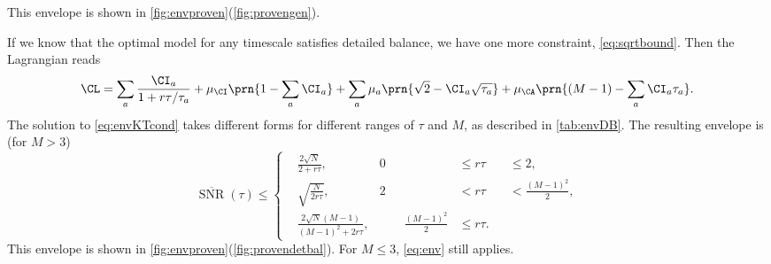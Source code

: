 \documentclass[12pt]{article}
\DeclareMathOperator{\snr}{SNR}
\newcommand{\snrb}{\overline{\snr}}
\begin{document}
This envelope is shown in \cref{fig:envproven}(\ref{fig:provengen}).

If we know that the optimal model for any timescale satisfies detailed balance, we have one more constraint, \cref{eq:sqrtbound}.
Then the Lagrangian reads
%
\begin{equation}\label{eq:envDBlagrangian}
  \CL = \sum_a \frac{\CI_a}{1+r\tau/\tau_a} + \mu_\CI \prn{1 - \sum_a \CI_a} 
      + \sum_a \mu_a \prn{\sqrt{2} - \CI_a \sqrt{\tau_a}} + \mu_\CA \prn{(M-1) - \sum_a \CI_a \tau_a}.
\end{equation}
%
The solution to \cref{eq:envKTcond} takes different forms for different ranges of \(\tau\) and \(M\),
as described in \cref{tab:envDB}.
The resulting envelope is (for \(M > 3\))
%
\begin{equation}\label{eq:envDB}
  \snrb(\tau) \leq 
  \left\{ 
  \begin{alignedat}{3}
    &\frac{2 \sqrt{N}}{2 + r \tau}
      , &
      0 &\leq r \tau &&\leq 2
      , \\
    &\sqrt{\frac{N}{2 r \tau}}
      , &
      2 &< r \tau &&< \frac{(M-1)^2}{2}
      , \\
    &\frac{2 \sqrt{N} (M-1)}{(M-1)^2 + 2r \tau}
      , &\qquad
      \frac{(M-1)^2}{2} &\leq r \tau 
      .
  \end{alignedat}
  \right.
\end{equation}
%
This envelope is shown in \cref{fig:envproven}(\ref{fig:provendetbal}).
For \(M \leq 3\), \cref{eq:env} still applies.
\end{document}
